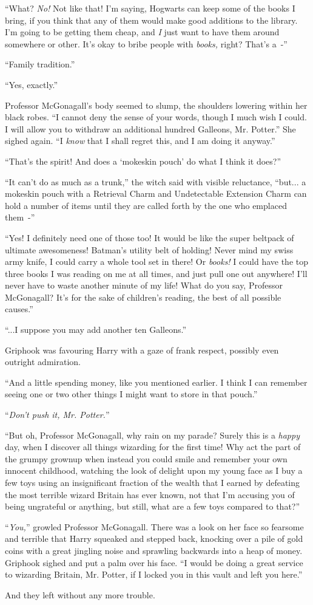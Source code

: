 ``What? \emph{No!} Not like that! I'm saying, Hogwarts can keep some of the books I bring, if you think that any of them would make good additions to the library. I'm going to be getting them cheap, and \emph{I} just want to have them around somewhere or other. It's okay to bribe people with \emph{books,} right? That's a~-''

``Family tradition.''

``Yes, exactly.''

Professor McGonagall's body seemed to slump, the shoulders lowering within her black robes. ``I cannot deny the sense of your words, though I much wish I could. I will allow you to withdraw an additional hundred Galleons, Mr. Potter.'' She sighed again. ``I \emph{know} that I shall regret this, and I am doing it anyway.''

``That's the spirit! And does a `mokeskin pouch' do what I think it does?''

``It can't do as much as a trunk,'' the witch said with visible reluctance, ``but... a mokeskin pouch with a Retrieval Charm and Undetectable Extension Charm can hold a number of items until they are called forth by the one who emplaced them~-''

``Yes! I definitely need one of those too! It would be like the super beltpack of ultimate awesomeness! Batman's utility belt of holding! Never mind my swiss army knife, I could carry a whole tool set in there! Or \emph{books!} I could have the top three books I was reading on me at all times, and just pull one out anywhere! I'll never have to waste another minute of my life! What do you say, Professor McGonagall? It's for the sake of children's reading, the best of all possible causes.''

``...I suppose you may add another ten Galleons.''

Griphook was favouring Harry with a gaze of frank respect, possibly even outright admiration.

``And a little spending money, like you mentioned earlier. I think I can remember seeing one or two other things I might want to store in that pouch.''

``\emph{Don't push it, Mr. Potter.}''

``But oh, Professor McGonagall, why rain on my parade? Surely this is a \emph{happy} day, when I discover all things wizarding for the first time! Why act the part of the grumpy grownup when instead you could smile and remember your own innocent childhood, watching the look of delight upon my young face as I buy a few toys using an insignificant fraction of the wealth that I earned by defeating the most terrible wizard Britain has ever known, not that I'm accusing you of being ungrateful or anything, but still, what are a few toys compared to that?''

``\emph{You,}'' growled Professor McGonagall. There was a look on her face so fearsome and terrible that Harry squeaked and stepped back, knocking over a pile of gold coins with a great jingling noise and sprawling backwards into a heap of money. Griphook sighed and put a palm over his face. ``I would be doing a great service to wizarding Britain, Mr. Potter, if I locked you in this vault and left you here.''

And they left without any more trouble.
